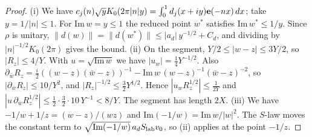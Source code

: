 \begin{proof}
(i) We have $c_j(n)\sqrt yK_0(2\pi|n|y)=\int_0^1d_j(x+iy)\mathbf{e}(-nx)\,dx$; take $y=1/|n|\le1$. For $\mathrm{Im}\,w=y\le1$ the reduced point $w^*$ satisfies $\mathrm{Im}\,w^*\le1/y$. Since $\rho$ is unitary, $\|d(w)\|=\|d(w^*)\|\le|a_d|\,y^{-1/2}+C_d$, and dividing by $|n|^{-1/2}K_0(2\pi)$ gives the bound.
(ii) On the segment, $Y/2\le|w-z|\le3Y/2$, so $|R_z|\le4/Y$. With $u=\sqrt{\mathrm{Im}\,w}$ we have $|u_w|=\tfrac14Y^{-1/2}$. Also $\partial_{\bar w}R_z=\tfrac i2((w-z)(\bar w-z))^{-1}-\mathrm{Im}\,w\,(w-z)^{-1}(\bar w-z)^{-2}$, so $|\partial_{\bar w}R_z|\le10/Y^2$, and $|R_z|^{-1/2}\le\tfrac32Y^{1/2}$. Hence $|u_wR_z^{1/2}|\le\tfrac1{2Y}$ and $|u\,\partial_{\bar w}R_z^{1/2}|\le\tfrac12\cdot\tfrac32\cdot10\,Y^{-1}<8/Y$. The segment has length $2X$.
(iii) We have $-1/w+1/z=(w-z)/(wz)$ and $\mathrm{Im}(-1/w)=\mathrm{Im}\,w/|w|^2$. The $S$-law moves the constant term to $\sqrt{\mathrm{Im}(-1/w)}\,a_dS_{\rm lab}v_0$, so (ii) applies at the point $-1/z$.
\end{proof}
